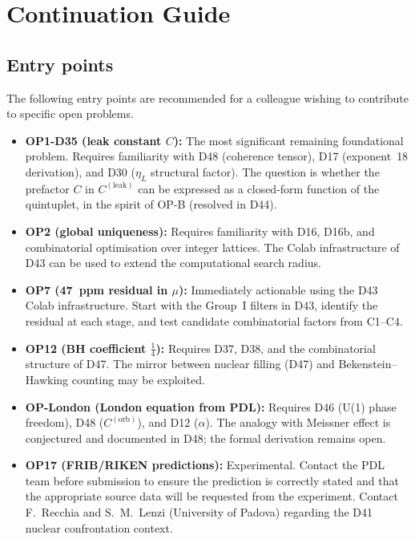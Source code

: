 \documentclass[11pt,a4paper]{article}
\theoremstyle{plain}
\theoremstyle{definition}
\theoremstyle{remark}
\begin{document}
\section{Continuation Guide}
\label{sec:continuation}

\subsection{Entry points}
\label{subsec:entrypoints}
The following entry points are recommended for a colleague wishing to contribute to specific open problems.

\begin{itemize}
\item \textbf{OP1-D35 (leak constant $C$):} The most significant remaining foundational problem. Requires familiarity with D48 (coherence tensor), D17 (exponent~18 derivation), and D30 ($\eta_L$ structural factor). The question is whether the prefactor $C$ in $C^{(\mathrm{leak})}$ can be expressed as a closed-form function of the quintuplet, in the spirit of OP-B (resolved in D44).
\item \textbf{OP2 (global uniqueness):} Requires familiarity with D16, D16b, and combinatorial optimisation over integer lattices. The Colab infrastructure of D43 can be used to extend the computational search radius.
\item \textbf{OP7 (47~ppm residual in $\mu$):} Immediately actionable using the D43 Colab infrastructure. Start with the Group~I filters in D43, identify the residual at each stage, and test candidate combinatorial factors from C1--C4.
\item \textbf{OP12 (BH coefficient $\tfrac{1}{4}$):} Requires D37, D38, and the combinatorial structure of D47. The mirror between nuclear filling (D47) and Bekenstein--Hawking counting may be exploited.
\item \textbf{OP-London (London equation from PDL):} Requires D46 (U(1) phase freedom), D48 ($C^{(\mathrm{orb})}$), and D12 ($\alpha$). The analogy with Meissner effect is conjectured and documented in D48; the formal derivation remains open.
\item \textbf{OP17 (FRIB/RIKEN predictions):} Experimental. Contact the PDL team before submission to ensure the prediction is correctly stated and that the appropriate source data will be requested from the experiment. Contact F.\ Recchia and S.\ M.\ Lenzi (University of Padova) regarding the D41 nuclear confrontation context.
\end{itemize}
\end{document}
